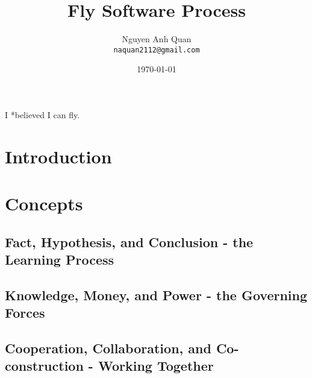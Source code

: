 \documentclass[10pt,a4paper]{book}
\newenvironment{dedication}
{
   \clearpage
   \thispagestyle{empty}
   \vspace*{\stretch{1}}
   \itshape
   \raggedright
}%
{
   \par
   \vspace*{\stretch{3}}
   \clearpage
}
\begin{document}
\frontmatter

\title{Fly Software Process}
\author{Nguyen Anh Quan\\
  \texttt{naquan2112@gmail.com}}
\date{\today}
\maketitle

\begin{dedication}
  I *believed I can fly.
\end{dedication}

\tableofcontents

\mainmatter

\chapter{Introduction}

\lipsum[1-10]

\chapter{Concepts}
\section[Learning Process]{Fact, Hypothesis, and Conclusion - the Learning Process}

\lipsum[1-20]

\section[Governing Forces]{Knowledge, Money, and Power - the Governing Forces}

\lipsum[1-20]

\section[Working Together]{Cooperation, Collaboration, and Co-construction - Working Together}

\lipsum[1-20]

\backmatter
\end{document}
